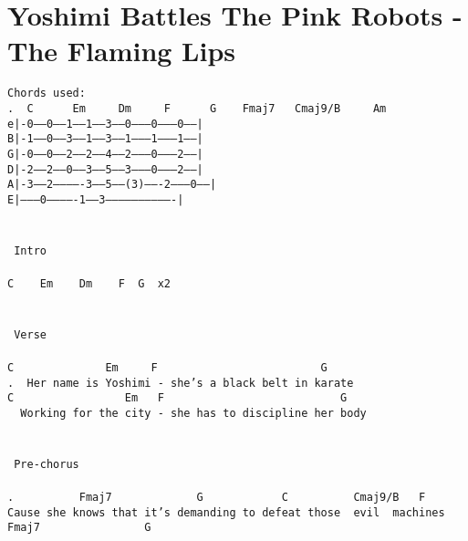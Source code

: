 \newpage
\section{Yoshimi Battles The Pink Robots - The Flaming Lips}
\label{Yoshimi Battles The Pink Robots - The Flaming Lips}
\texttt{Chords\ used:\\
.\ \ C\ \ \ \ \ \ Em\ \ \ \ \ Dm\ \ \ \ \ F\ \ \ \ \ \ G\ \ \ \ Fmaj7\ \ \ Cmaj9/B\ \ \ \ \ Am\\
e|-0------0------1------1------3------0--------0--------0------|\\
B|-1------0------3------1------3------1--------1--------1------|\\
G|-0------0------2------2------4------2--------0--------2------|\\
D|-2------2------0------3------5------3--------0--------2------|\\
A|-3------2-------------3------5-----(3)-------2--------0------|\\
E|--------0-------------1------3-------------------------------|\\
\\
\\
\lbrack\ Intro\rbrack\\
\\
C\ \ \ \ Em\ \ \ \ Dm\ \ \ \ F\ \ G\ \ x2\\
\\
\\
\lbrack\ Verse\rbrack\\
\\
C\ \ \ \ \ \ \ \ \ \ \ \ \ \ Em\ \ \ \ \ F\ \ \ \ \ \ \ \ \ \ \ \ \ \ \ \ \ \ \ \ \ \ \ \ \ G\\
.\ \ Her\ name\ is\ Yoshimi\ -\ she's\ a\ black\ belt\ in\ karate\\
C\ \ \ \ \ \ \ \ \ \ \ \ \ \ \ \ \ Em\ \ \ F\ \ \ \ \ \ \ \ \ \ \ \ \ \ \ \ \ \ \ \ \ \ \ \ \ \ \ G\\
\ \ Working\ for\ the\ city\ -\ she\ has\ to\ discipline\ her\ body\\
\\
\\
\lbrack\ Pre-chorus\rbrack\\
\\
.\ \ \ \ \ \ \ \ \ \ Fmaj7\ \ \ \ \ \ \ \ \ \ \ \ \ G\ \ \ \ \ \ \ \ \ \ \ \ C\ \ \ \ \ \ \ \ \ \ Cmaj9/B\ \ \ F\\
Cause\ she\ knows\ that\ it's\ demanding\ to\ defeat\ those\ \ evil\ \ machines\\
Fmaj7\ \ \ \ \ \ \ \ \ \ \ \ \ \ \ \ G\\
}

